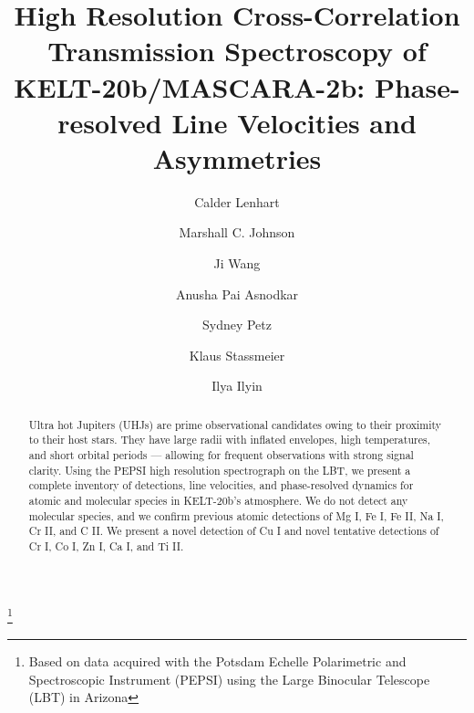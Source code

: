 \documentclass[twocolumn]{aastex631}
\begin{document}
    \title{High Resolution Cross-Correlation Transmission Spectroscopy of KELT-20b/MASCARA-2b: Phase-resolved Line Velocities and Asymmetries} \footnote{Based on data acquired with the Potsdam Echelle Polarimetric and Spectroscopic Instrument (PEPSI) using the Large Binocular Telescope (LBT) in Arizona}

    \author[0009-0001-1459-3738]{Calder Lenhart}

    \author[0000-0002-5099-8185]{Marshall C. Johnson}

    \author{Ji Wang}

    \author[0000-0002-8823-8237]{Anusha Pai Asnodkar}

    \author{Sydney Petz}

    \author[0000-0002-6192-6494]{Klaus Stassmeier}

    \author[0000-0002-0551-046X]{Ilya Ilyin}


    \begin{abstract}
        Ultra hot Jupiters (UHJs) are prime observational candidates owing to their proximity to their host stars. They have large radii with inflated envelopes, high temperatures, and short orbital periods --- allowing for frequent observations with strong signal clarity. Using the PEPSI high resolution spectrograph on the LBT, we present a complete inventory of detections, line velocities, and phase-resolved dynamics for atomic and molecular species in KELT-20b's atmosphere. We do not detect any molecular species, and we confirm previous atomic detections of Mg I, Fe I, Fe II, Na I, Cr II, and C II. We present a novel detection of Cu I and novel tentative detections of Cr I, Co I, Zn I, Ca I, and Ti II.
    \end{abstract}
\end{document}
